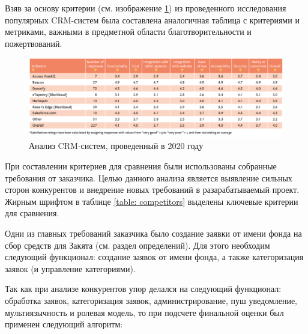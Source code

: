 \documentclass[a4paper,12pt,reqno]{article}
\begin{document}
Взяв за основу критерии (см. изображение \ref{table:research}) из проведенного исследования~\cite{researchcrm} популярных CRM-систем была составлена аналогичная таблица с критериями и метриками, важными в предметной области благотворительности и пожертвований.

\begin{figure}[H]
		\centering
		\includegraphics[width = \linewidth]{img/1221.png}
		\caption{Анализ CRM-систем, проведенный в 2020 году}
		\label{table:research}
\end{figure}

При составлении критериев для сравнения были использованы собранные требования от заказчика. Целью данного анализа является выявление сильных сторон конкурентов и внедрение новых требований в разарабатываемый проект. Жирным шрифтом в таблице \ref{table: competitors} выделены ключевые критерии для сравнения.



Одни из главных требований заказчика было создание заявки от имени фонда на сбор средств для Закята (см. раздел определений). Для этого необходим следующий функционал: создание заявок от имени фонда, а также категоризация заявок (и управление категориями).

Так как при анализе конкурентов упор делался на следующий функционал: обработка заявок, категоризация заявок, администрирование, пуш уведомление, мультиязычность и ролевая модель, то при подсчете финальной оценки был применен следующий алгоритм: 
\end{document}
